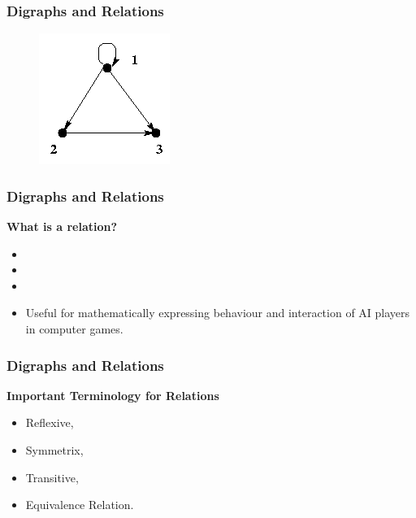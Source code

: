 \documentclass{beamer}
\begin{document}
\begin{frame}
\frametitle{Digraphs and Relations}
\begin{figure}
\centering
\includegraphics[width=0.8\linewidth]{./ex1}
\label{fig:ex1}
\end{figure}



\end{frame}
\begin{frame}
\frametitle{Digraphs and Relations}
\textbf{What is a relation?}
\begin{itemize}
\item 
\item 
\item 
\item Useful for mathematically expressing behaviour and interaction of AI players in computer games.
\end{itemize}

\end{frame}
\begin{frame}
\frametitle{Digraphs and Relations}
\textbf{Important Terminology for Relations}
\begin{itemize}
\item Reflexive,
\item Symmetrix,
\item Transitive,
\item Equivalence Relation.
\end{itemize}

\end{frame}
\end{document}
